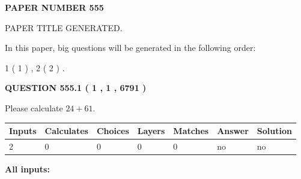 \documentclass[12pt]{article}
\begin{document}
   
   
   
\newpage 
\setcounter{page}{ 
   555001 } 
   
   
   
   
 {\textbf{ \Large{ PAPER NUMBER  555  }}}
   
   
\vspace{0.2in}
   
   
   
   
   
   
   
   
 \vspace{0.2in}
 
 
 
 
   
   
 PAPER TITLE GENERATED.
   
   
   
\vspace{0.2in}
   
In this paper, big questions will be generated in the following order: 
   
   
   1 ( 1 )
 ,
   2 ( 2 )
 .
  
\vspace{0.2in}
  
{\textbf{\Large{QUESTION
555.1 
 ( 1 , 1 , 6791 )
}}}
  
  
 
Please calculate $ %
24 +  %
61 $.
 
 
   
   
   
   
\noindent\begin{tabular}{|l|l|l|l|l|l|l|}
 \hline
Inputs & Calculates & Choices & Layers & Matches & Answer & Solution \\ \hline
 2  & 
 0  & 
 0
  & 
 0  & 
 0  & 
  no & 
  no 
  \\ \hline
 \end{tabular}
   
   
   
   
\noindent{}
   
   
   
   
\noindent\vspace{0.1in}\hspace{-0.08in} {\textbf{\Large{All inputs: }}}
   
   
  
\end{document}
